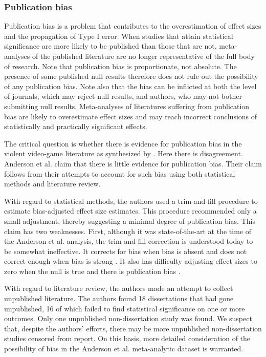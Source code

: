 \documentclass[man]{apa6}
\begin{document}
\subsubsection{Publication bias}
Publication bias is a problem that contributes to the overestimation of effect sizes and the propagation of Type I error. When studies that attain statistical significance are more likely to be published than those that are not, meta-analyses of the published literature are no longer representative of the full body of research. Note that publication bias is proportionate, not absolute. The presence of some published null results therefore does not rule out the possibility of any publication bias. Note also that the bias can be inflicted at both the level of journals, which may reject null results, and authors, who may not bother submitting null results.
Meta-analyses of literatures suffering from publication bias are likely to overestimate effect sizes and may reach incorrect conclusions of statistically and practically significant effects.

The critical question is whether there is evidence for publication bias in the violent video-game literature as synthesized by \citet{Anderson:etal:2010}.  Here there is disagreement.  Anderson et al. claim that there is little evidence for publication bias.  Their claim follows from their attempts to account for such bias using both statistical methods and literature review.  

With regard to statistical methods, the authors used a trim-and-fill procedure to estimate bias-adjusted effect size estimates. This procedure recommended only a small adjustment, thereby suggesting a minimal degree of publication bias. This claim has two weaknesses. First, although it was state-of-the-art at the time of the Anderson et al. analysis, the trim-and-fill correction is understood today to be somewhat ineffective. It corrects for bias when bias is absent and does not correct enough when bias is strong \citep{Simonsohn:etal:2014b,vanAssen:etal:2015}. It also has difficulty adjusting effect sizes to zero when the null is true and there is publication bias \citep{Moreno:etal:2009,vanAssen:etal:2015}. 

With regard to literature review, the authors made an attempt to collect unpublished literature. The authors found 18 dissertations that had gone unpublished, 16 of which failed to find statistical significance on one or more outcomes. Only one unpublished non-dissertation study was found. We suspect that, despite the authors' efforts, there may be more unpublished non-dissertation studies censored from report. On this basis, more detailed consideration of the possibility of bias in the Anderson et al. meta-analytic dataset is warranted.
\end{document}
